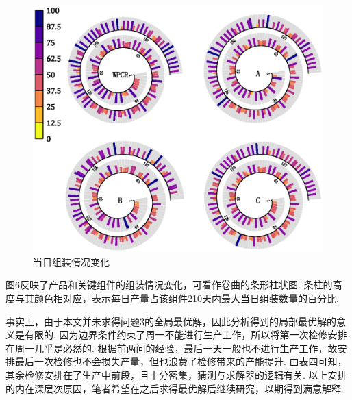 \begin{figure}[!htbp]
	\centering
	\includegraphics[width=16cm]{Image/问题三展示.eps}
	\caption{当日组装情况变化}\label{当日组装情况变化}
\end{figure}

图6反映了产品和关键组件的组装情况变化，可看作卷曲的条形柱状图.
条柱的高度与其颜色相对应，表示每日产量占该组件210天内最大当日组装数量的百分比.

\begin{table}[!htbp]
\centering
\caption{检修日期及总成本}
\end{table}

事实上，由于本文并未求得问题3的全局最优解，因此分析得到的局部最优解的意义是有限的.
因为边界条件约束了周一不能进行生产工作，所以将第一次检修安排在周一几乎是必然的.
根据前两问的经验，最后一天一般也不进行生产工作，故安排最后一次检修也不会损失产量，但也浪费了检修带来的产能提升.
由表四可知，其余检修安排在了生产中前段，且十分密集，猜测与求解器的逻辑有关.
以上安排的内在深层次原因，笔者希望在之后求得最优解后继续研究，以期得到满意解释.

